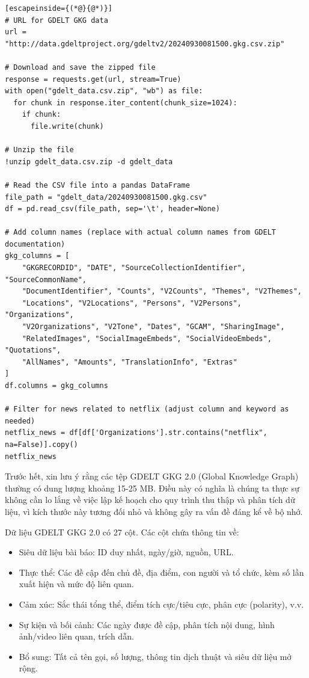 \begin{lstlisting}[escapeinside={(*@}{@*)}]
# URL for GDELT GKG data
url = "http://data.gdeltproject.org/gdeltv2/20240930081500.gkg.csv.zip"

# Download and save the zipped file
response = requests.get(url, stream=True)
with open("gdelt_data.csv.zip", "wb") as file:
  for chunk in response.iter_content(chunk_size=1024):
    if chunk:
      file.write(chunk)

# Unzip the file
!unzip gdelt_data.csv.zip -d gdelt_data

# Read the CSV file into a pandas DataFrame
file_path = "gdelt_data/20240930081500.gkg.csv"
df = pd.read_csv(file_path, sep='\t', header=None)

# Add column names (replace with actual column names from GDELT documentation)
gkg_columns = [
    "GKGRECORDID", "DATE", "SourceCollectionIdentifier", "SourceCommonName",
    "DocumentIdentifier", "Counts", "V2Counts", "Themes", "V2Themes",
    "Locations", "V2Locations", "Persons", "V2Persons", "Organizations",
    "V2Organizations", "V2Tone", "Dates", "GCAM", "SharingImage",
    "RelatedImages", "SocialImageEmbeds", "SocialVideoEmbeds", "Quotations",
    "AllNames", "Amounts", "TranslationInfo", "Extras"
]
df.columns = gkg_columns

# Filter for news related to netflix (adjust column and keyword as needed)
netflix_news = df[df['Organizations'].str.contains("netflix", na=False)].copy()
netflix_news
\end{lstlisting}

Trước hết, xin lưu ý rằng các tệp GDELT GKG 2.0 (Global Knowledge Graph) thường có dung lượng khoảng 15-25 MB. Điều này có nghĩa là chúng ta thực sự không cần lo lắng về việc lập kế hoạch cho quy trình thu thập và phân tích dữ liệu, vì kích thước này tương đối nhỏ và không gây ra vấn đề đáng kể về bộ nhớ.

Dữ liệu GDELT GKG 2.0 có 27 cột. Các cột chứa thông tin về:

\begin{itemize}
\item
  Siêu dữ liệu bài báo: ID duy nhất, ngày/giờ, nguồn, URL.
\item
  Thực thể: Các đề cập đến chủ đề, địa điểm, con người và tổ chức, kèm số lần xuất hiện và mức độ liên quan.
\item
  Cảm xúc: Sắc thái tổng thể, điểm tích cực/tiêu cực, phân cực (polarity), v.v.
\item
  Sự kiện và bối cảnh: Các ngày được đề cập, phân tích nội dung, hình ảnh/video liên quan, trích dẫn.
\item
  Bổ sung: Tất cả tên gọi, số lượng, thông tin dịch thuật và siêu dữ liệu mở rộng.
\end{itemize}


